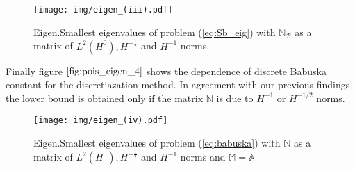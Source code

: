 \documentclass[a4paper,10pt]{article}
\newcommand{\Amat}{\ensuremath{\mathbb{A}}}
\newcommand{\Mmat}{\ensuremath{\mathbb{M}}}
\newcommand{\Nmat}{\ensuremath{\mathbb{N}}}
\begin{document}
\begin{figure}
  \begin{center}
    \texttt{[image: img/eigen\_(iii).pdf]}
    \caption{Eigen.Smallest eigenvalues of problem (\ref{eq:Sb_eig}) with
      $\Nmat_\mathcal{B}$ as
    a matrix of $L^2(H^0), H^{-\tfrac{1}{2}}$ and $H^{-1}$ norms.}
  \label{fig:pois_eigen_3}
  \end{center}
\end{figure}
Finally figure $\ref{fig:pois_eigen_4}$ shows the dependence of discrete 
Babuska constant for the discretiazation method.
In agreement with our previous findings the lower bound is obtained only if the
matrix $\Nmat$ is due to $H^{-1}$ or $H^{-1/2}$ norms.
\begin{figure}
  \begin{center}
    \texttt{[image: img/eigen\_(iv).pdf]}
    \caption{Eigen.Smallest eigenvalues of problem (\ref{eq:babuska}) with $\Nmat$ as
    a matrix of $L^2(H^0), H^{-\tfrac{1}{2}}$ and $H^{-1}$ norms and
  $\Mmat=\Amat$}
  \label{fig:pois_eigen_4}
  \end{center}
\end{figure}
\end{document}
